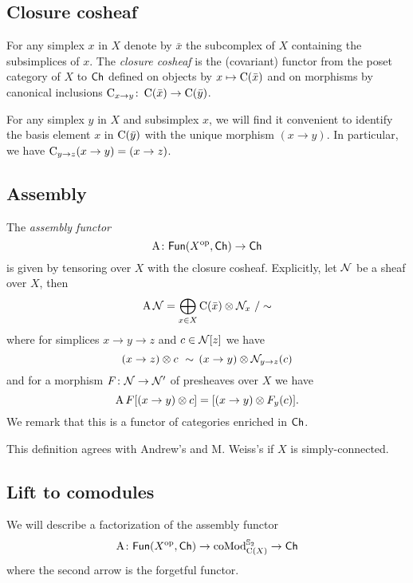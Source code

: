 \subsection{Closure cosheaf}

For any simplex $x$ in $X$ denote by $\bar x$ the subcomplex of $X$ containing the subsimplices of $x$.
The \textit{closure cosheaf} is the (covariant) functor from the poset category of $X$ to $\mathsf{Ch}$ defined on objects by $x \mapsto \operatorname{C}(\bar x)$ and on morphisms by canonical inclusions $\operatorname{C}_{x \to y} \colon \operatorname{C}(\bar x) \to \operatorname{C}(\bar y)$.

For any simplex $y$ in $X$ and subsimplex $x$, we will find it convenient to identify the basis element $x$ in $\operatorname{C}(\bar y)$ with the unique morphism $(x \to y)$.
In particular, we have $\operatorname{C}_{y \to z} (x \to y) = (x \to z)$.

\subsection{Assembly} \label{ss:assembly}

The \textit{assembly functor}
\[
\operatorname{A} \colon \mathsf{Fun}(X^{\mathrm{op}}, \mathsf{Ch}) \to \mathsf{Ch}
\]
is given by tensoring over $X$ with the closure cosheaf.
Explicitly, let $\mathcal{N}$ be a sheaf over $X$, then
\[
\operatorname{A} \mathcal{N} = \bigoplus_{x \in X} \operatorname{C}(\bar x) \otimes \mathcal{N}_x \ / \sim
\]
where for simplices $x \to y \to z$ and $c \in \mathcal{N}[z]$ we have
\[
(x \to z) \otimes c \ \sim \, (x \to y) \otimes \mathcal{N}_{y \to z}(c)
\]
and for a morphism $F \colon \mathcal{N} \to \mathcal{N}'$ of presheaves over $X$ we have
\[
\operatorname{A} F[(x \to y) \otimes c] = [(x \to y) \otimes F_y(c)].
\]
We remark that this is a functor of categories enriched in $\mathsf{Ch}$.

This definition agrees with Andrew's and M. Weiss's \cite[Definition 1.4]{ranicki1990assembly} if $X$ is simply-connected.

\subsection{Lift to comodules}

We will describe a factorization of the assembly functor
\[
\operatorname{A} \colon \mathsf{Fun}(X^{\mathrm{op}}, \mathsf{Ch}) \to \operatorname{coMod}^{\mathbb{S}_2}_{\operatorname{C}(X)} \to \mathsf{Ch}
\]
where the second arrow is the forgetful functor.

